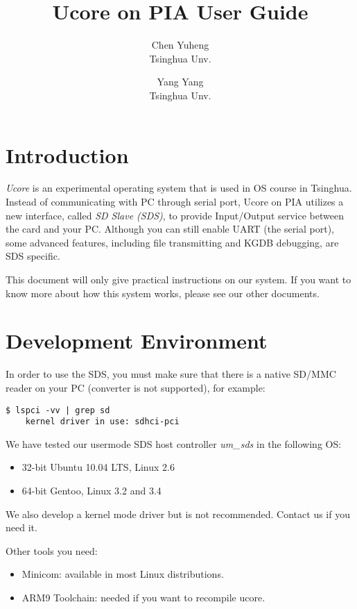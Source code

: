 \documentclass[a4paper]{article}
\begin{document}
\title{Ucore on PIA User Guide}
\author{Chen Yuheng \\ Tsinghua Unv. \and Yang Yang\\ Tsinghua Unv.}
\maketitle

\section{Introduction}
\emph{Ucore} is an experimental operating system that is used in OS course in Tsinghua. Instead of communicating with PC through serial port, Ucore on PIA utilizes a new interface, called \emph{SD Slave (SDS)}, to provide Input/Output service between the card and your PC. Although you
can still enable UART (the serial port), some advanced features, including file transmitting and KGDB debugging, are SDS specific.

This document will only give practical instructions on our system. If you want to know more about how this system works, please see our other documents.

\section{Development Environment}
In order to use the SDS, you must make sure that there is a native SD/MMC reader on your PC (converter is not supported), for example:

\begin{verbatim}
$ lspci -vv | grep sd
    kernel driver in use: sdhci-pci
\end{verbatim}

We have tested our usermode SDS host controller \emph{um\_sds} in the following OS:

\begin{itemize}
\item 32-bit Ubuntu 10.04 LTS, Linux 2.6
\item 64-bit Gentoo, Linux 3.2 and 3.4
\end{itemize}

We also develop a kernel mode driver but is not recommended. Contact us
if you need it.

Other tools you need:
\begin{itemize}
\item Minicom: available in most Linux distributions.
\item ARM9 Toolchain: needed if you want to recompile ucore.
\end{itemize}
\end{document}
